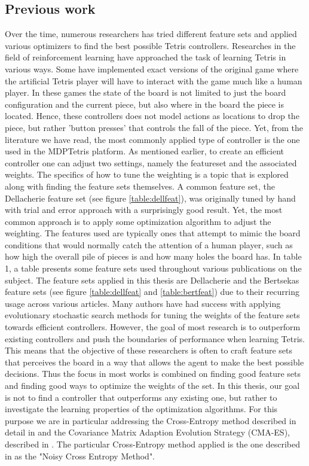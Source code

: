 \subsection{Previous work \label{prevWork}}
Over the time, numerous researchers has tried different feature 
sets and applied various optimizers to find the best 
possible Tetris controllers. Researches in the field
of reinforcement learning have approached the task of learning Tetris
in various ways. Some have implemented exact versions of the original game
where the artificial Tetris player will have to interact with the 
game much like a human player. In these games the state of the board is not limited
to just the board configuration and the current piece, but also where in the 
board the piece is located. Hence, these controllers does not model actions 
as locations to drop the piece, but rather 'button presses' that controls the
fall of the piece. Yet, from the literature we have read, the most commonly applied 
type of controller is the one used in the MDPTetris platform. As mentioned earlier,
to create an efficient controller one can adjust two settings, namely the featureset 
and the associated weights. 
The specifics of how to tune the weighting is a topic that is 
explored along with finding the feature sets themselves. A common 
feature set, the Dellacherie feature set (see figure \ref{table:dellfeat}),
was originally tuned by hand with trial and error approach with a surprisingly 
good result. Yet, the most common approach is to apply some optimization 
algorithm to adjust the weighting.
The features used are typically
ones that attempt to mimic the board conditions that would
normally catch the attention of a human player, such as
how high the overall pile of pieces is and how many holes 
the board has. In \citep{scherrer2009:b} table 1, a table 
presents some feature sets used throughout various publications
on the subject. The feature sets applied in this thesis are 
Dellacherie and the Bertsekas feature sets 
(see figure \ref{table:dellfeat} and \ref{table:bertfeat}) due 
to their recurring usage across various articles.
Many authors have had success
with applying evolutionary stochastic search methods for tuning 
the weights of the feature sets towards
efficient controllers. However, the goal of most research 
is to outperform existing controllers and push the boundaries
of performance when learning Tetris. This means that the objective of
these researchers is often to craft feature sets that perceives the 
board in a way that allows the agent to make the best possible decisions.
Thus the focus in most works is combined on finding good feature sets and 
finding good ways to optimize the weights of the set. In this thesis,
our goal is not to find a controller that outperforms any existing one,
but rather to investigate the learning properties of the optimization algorithms.
For this purpose
we are in particular addressing the
Cross-Entropy method described in detail in \citep{cetut2014} and the
Covariance Matrix Adaption Evolution Strategy (CMA-ES), described 
in \citep{hansen2011}. The particular Cross-Entropy method applied 
is the one described in \citep{szita:06} as the "Noisy Cross Entropy Method".\\

